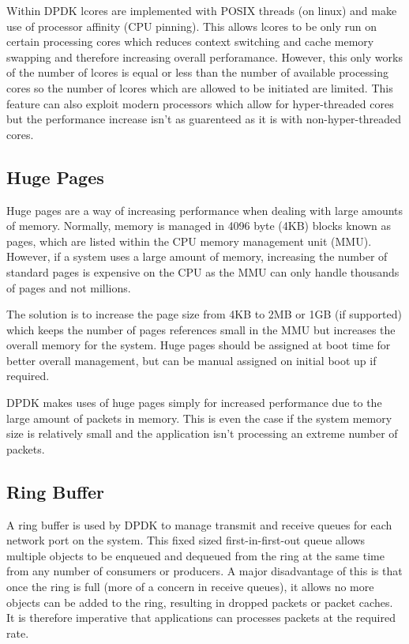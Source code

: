 \documentclass[final_report.tex]{subfiles}
\begin{document}
Within DPDK lcores are implemented with POSIX threads (on linux) and make use of processor affinity (CPU pinning). This allows lcores to be only run on certain processing cores which reduces context switching and cache memory swapping and therefore increasing overall perforamance. However, this only works of the number of lcores is equal or less than the number of available processing cores so the number of lcores which are allowed to be initiated are limited. This feature can also exploit modern processors which allow for hyper-threaded cores but the performance increase isn't as guarenteed as it is with non-hyper-threaded cores.

\subsection{Huge Pages}
\label{subsec:hugepages}
Huge pages are a way of increasing performance when dealing with large amounts of memory. Normally, memory is managed in 4096 byte (4KB) blocks known as pages, which are listed within the CPU memory management unit (MMU). However, if a system uses a large amount of memory, increasing the number of standard pages is expensive on the CPU as the MMU can only handle thousands of pages and not millions.

The solution is to increase the page size from 4KB to 2MB or 1GB (if supported) which keeps the number of pages references small in the MMU but increases the overall memory for the system. Huge pages should be assigned at boot time for better overall management, but can be manual assigned on initial boot up if required.

DPDK makes uses of huge pages simply for increased performance due to the large amount of packets in memory. This is even the case if the system memory size is relatively small and the application isn't processing an extreme number of packets.

\subsection{Ring Buffer}
A ring buffer is used by DPDK to manage transmit and receive queues for each network port on the system. This fixed sized first-in-first-out queue allows multiple objects to be enqueued and dequeued from the ring at the same time from any number of consumers or producers. A major disadvantage of this is that once the ring is full (more of a concern in receive queues), it allows no more objects can be added to the ring, resulting in dropped packets or packet caches. It is therefore imperative that applications can processes packets at the required rate.
\end{document}
